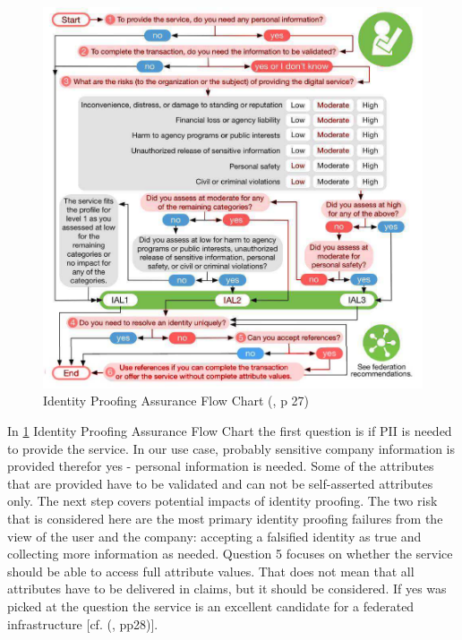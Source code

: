 \begin{figure}[h]
	\centering
	\includegraphics[width=0.9\linewidth]{images/ial_flow}
	\caption{Identity Proofing Assurance Flow Chart (\cite{NIST:2017:DIG}, p 27)}
	\label{fig:ialflow}
\end{figure}

In \ref{fig:ialflow} Identity Proofing Assurance Flow Chart the first question is if PII is needed to provide the service. In our use case, probably sensitive company information is provided therefor yes - personal information is needed. Some of the attributes that are provided have to be validated and can not be self-asserted attributes only. The next step covers potential impacts of identity proofing. The two risk that is considered here are the most primary identity proofing failures from the view of the user and the company: accepting a falsified identity as true and collecting more information as needed. Question 5 focuses on whether the service should be able to access full attribute values. That does not mean that all attributes have to be delivered in claims, but it should be considered. If yes was picked at the question the service is an excellent candidate for a federated infrastructure [cf. (\cite{NIST:2017:DIG}, pp28)]. 

